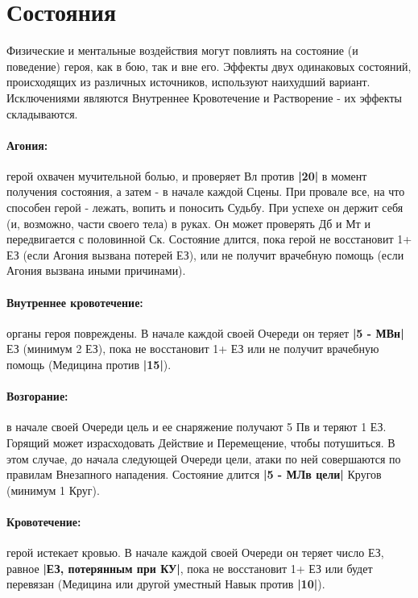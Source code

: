 \section{Состояния}
Физические и ментальные воздействия могут повлиять на состояние (и поведение) героя, как в бою, так и вне его. Эффекты двух одинаковых состояний, происходящих из различных источников, используют наихудший вариант.
\newline Исключениями являются Внутреннее Кровотечение и Растворение - их эффекты складываются.
\paragraph{Агония:} герой охвачен мучительной болью, и проверяет Вл против \textbf{|20|} в момент получения состояния, а затем - в начале каждой Сцены. 
\newline При провале все, на что способен герой - лежать, вопить и поносить Судьбу. При успехе он держит себя (и, возможно, части своего тела) в руках. Он может проверять Дб и Мт и передвигается с половинной Ск. 
\newline Состояние длится, пока герой не восстановит 1+ ЕЗ (если Агония вызвана потерей ЕЗ), или не получит врачебную помощь (если Агония вызвана иными причинами). 
\paragraph{Внутреннее кровотечение:} органы героя повреждены. В начале каждой своей Очереди он теряет \textbf{|5 - МВн|} ЕЗ (минимум 2 ЕЗ), пока не восстановит 1+ ЕЗ или не получит врачебную помощь (Медицина против \textbf{|15|}).
\paragraph{Возгорание:} в начале своей Очереди цель и ее снаряжение получают 5 Пв и теряют 1 ЕЗ. Горящий может израсходовать Действие и Перемещение, чтобы потушиться. В этом случае, до начала следующей Очереди цели, атаки по ней совершаются по правилам Внезапного нападения.
\newline Состояние длится \textbf{|5 - МЛв цели|} Кругов (минимум 1 Круг).
\paragraph{Кровотечение:} герой истекает кровью. В начале каждой своей Очереди он теряет число ЕЗ, равное \textbf{|ЕЗ, потерянным при КУ|}, пока не восстановит 1+ ЕЗ или будет перевязан (Медицина или другой уместный Навык против \textbf{|10|}). 
